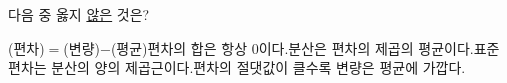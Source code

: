 다음 중 옳지 \underline{않은} 것은?
\begin{choicesv}{(편차)$=$(변량)$-$(평균)}{편차의 합은 항상 0이다.}{분산은 편차의 제곱의 평균이다.}{표준편차는 분산의 양의 제곱근이다.}{편차의 절댓값이 클수록 변량은 평균에 가깝다.}\end{choicesv}
